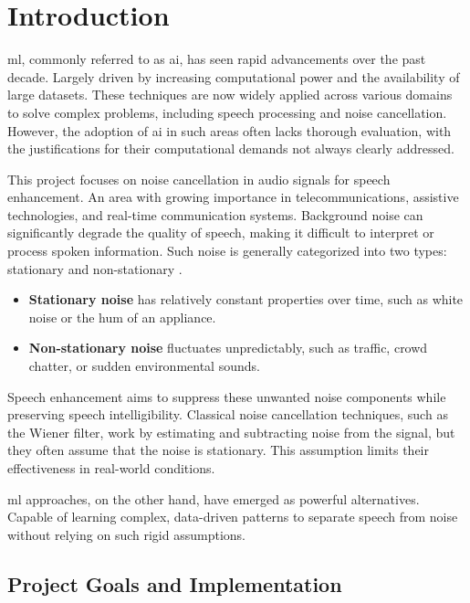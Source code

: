 \graphicspath{{content/chapters/1_introduction/figures}}
\chapter{Introduction}
\label{chp:introduction}

\gls{ml}, commonly referred to as \gls{ai}, has seen rapid advancements over the past decade. Largely driven by increasing computational power and the availability of large datasets. These techniques are now widely applied across various domains to solve complex problems, including speech processing and noise cancellation. However, the adoption of \gls{ai} in such areas often lacks thorough evaluation, with the justifications for their computational demands not always clearly addressed.

This project focuses on noise cancellation in audio signals for speech enhancement. An area with growing importance in telecommunications, assistive technologies, and real-time communication systems. Background noise can significantly degrade the quality of speech, making it difficult to interpret or process spoken information. Such noise is generally categorized into two types: stationary and non-stationary \cite{loizou2013speech}.

\begin{itemize}
    \item \textbf{Stationary noise} has relatively constant properties over time, such as white noise or the hum of an appliance.
    \item \textbf{Non-stationary noise} fluctuates unpredictably, such as traffic, crowd chatter, or sudden environmental sounds.
\end{itemize}

Speech enhancement aims to suppress these unwanted noise components while preserving speech intelligibility. Classical noise cancellation techniques, such as the Wiener filter, work by estimating and subtracting noise from the signal, but they often assume that the noise is stationary. This assumption limits their effectiveness in real-world conditions. 

\gls{ml} approaches, on the other hand, have emerged as powerful alternatives. Capable of learning complex, data-driven patterns to separate speech from noise without relying on such rigid assumptions.

\section{Project Goals and Implementation}

